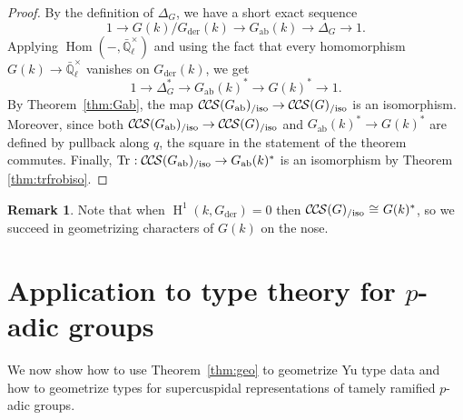 \documentclass[10pt]{amsart}
\theoremstyle{plain}
\theoremstyle{definition}
\newtheorem{remark}[theorem]{Remark}
\newcommand{\EE}{\mathbb{\bar Q}_\ell}
\newcommand{\Fq}{k}
\newcommand{\EEx}{\EE^\times}
\DeclareMathOperator{\Hom}{Hom}
\DeclareMathOperator{\Hh}{H}
\newcommand{\der}{_{\operatorname{der}}}
\newcommand{\ab}{_{\operatorname{ab}}}
\newcommand{\iso}{{\ \cong\ }}
\DeclareMathOperator{\Tr}{Tr}
\newcommand{\TrFrob}[1]{\Tr_{#1}}
\newcommand{\CCS}{{\mathcal{C\hskip-.8pt C\hskip-0.8pt S}}}
\newcommand{\CCSiso}[1]{\CCS(#1)_{/\text{iso}}}
\begin{document}
\begin{proof}
By the definition of $\Delta_G$, we have a short exact sequence
\[
1 \to G(k) / G\der(k) \to G\ab(k) \to \Delta_G \to 1.
\]
Applying $\Hom(-, \EEx)$ and using the fact that every homomorphism $G(k) \to \EEx$ vanishes on $G\der(k)$, we get
\[
1 \to \Delta_G^* \to G\ab(k)^* \to G(k)^* \to 1.
\]
By Theorem~\ref{thm:Gab}, the map $\CCSiso{G\ab} \to \CCSiso{G}$ is an isomorphism.
Moreover, since both $\CCSiso{G\ab} \to \CCSiso{G}$ and $G\ab(k)^* \to G(k)^*$ are
defined by pullback along $q$, the square in the statement of the theorem commutes.
Finally, $\TrFrob{} : \CCSiso{G\ab} \to G\ab(k)^*$ is an isomorphism by Theorem \ref{thm:trfrobiso}.
\end{proof}

\begin{remark}
Note that when $\Hh^1(k,G\der) = 0$ then $\CCSiso{G} \iso G(\Fq)^*$, so
we succeed in geometrizing characters of $G(k)$ on the nose.
\end{remark}







\section{Application to type theory for \texorpdfstring{$p$}{p}-adic groups}\label{sec:types}

We now show how to use Theorem~\ref{thm:geo} to geometrize Yu type data and how to geometrize types for supercuspidal representations of tamely ramified $p$-adic groups.
\end{document}
